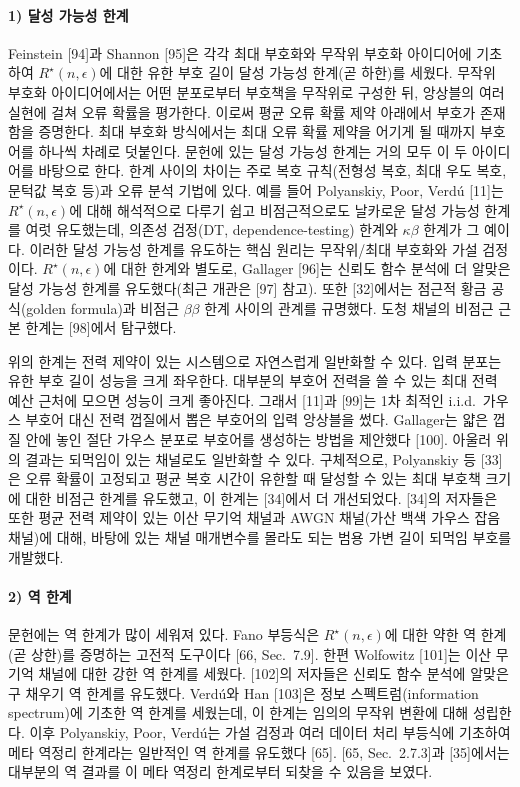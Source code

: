 \paragraph{1) 달성 가능성 한계}
Feinstein [94]과 Shannon [95]은 각각 최대 부호화와 무작위 부호화 아이디어에 기초하여 $R^\star(n,\epsilon)$에 대한 유한 부호 길이 달성 가능성 한계(곧 하한)를 세웠다. 무작위 부호화 아이디어에서는 어떤 분포로부터 부호책을 무작위로 구성한 뒤, 앙상블의 여러 실현에 걸쳐 오류 확률을 평가한다. 이로써 평균 오류 확률 제약 아래에서 부호가 존재함을 증명한다. 최대 부호화 방식에서는 최대 오류 확률 제약을 어기게 될 때까지 부호어를 하나씩 차례로 덧붙인다. 문헌에 있는 달성 가능성 한계는 거의 모두 이 두 아이디어를 바탕으로 한다. 한계 사이의 차이는 주로 복호 규칙(전형성 복호, 최대 우도 복호, 문턱값 복호 등)과 오류 분석 기법에 있다. 예를 들어 Polyanskiy, Poor, Verdú [11]는 $R^\star(n,\epsilon)$에 대해 해석적으로 다루기 쉽고 비점근적으로도 날카로운 달성 가능성 한계를 여럿 유도했는데, 의존성 검정(DT, dependence-testing) 한계와 $\kappa\beta$ 한계가 그 예이다. 이러한 달성 가능성 한계를 유도하는 핵심 원리는 무작위/최대 부호화와 가설 검정이다. $R^\star(n,\epsilon)$에 대한 한계와 별도로, Gallager [96]는 신뢰도 함수 분석에 더 알맞은 달성 가능성 한계를 유도했다(최근 개관은 [97] 참고). 또한 [32]에서는 점근적 황금 공식(golden formula)과 비점근 $\beta\beta$ 한계 사이의 관계를 규명했다. 도청 채널의 비점근 근본 한계는 [98]에서 탐구했다.

위의 한계는 전력 제약이 있는 시스템으로 자연스럽게 일반화할 수 있다. 입력 분포는 유한 부호 길이 성능을 크게 좌우한다. 대부분의 부호어 전력을 쓸 수 있는 최대 전력 예산 근처에 모으면 성능이 크게 좋아진다. 그래서 [11]과 [99]는 1차 최적인 i.i.d.\ 가우스 부호어 대신 전력 껍질에서 뽑은 부호어의 입력 앙상블을 썼다. Gallager는 얇은 껍질 안에 놓인 절단 가우스 분포로 부호어를 생성하는 방법을 제안했다 [100]. 아울러 위의 결과는 되먹임이 있는 채널로도 일반화할 수 있다. 구체적으로, Polyanskiy 등 [33]은 오류 확률이 고정되고 평균 복호 시간이 유한할 때 달성할 수 있는 최대 부호책 크기에 대한 비점근 한계를 유도했고, 이 한계는 [34]에서 더 개선되었다. [34]의 저자들은 또한 평균 전력 제약이 있는 이산 무기억 채널과 AWGN 채널(가산 백색 가우스 잡음 채널)에 대해, 바탕에 있는 채널 매개변수를 몰라도 되는 범용 가변 길이 되먹임 부호를 개발했다.

\paragraph{2) 역 한계}
문헌에는 역 한계가 많이 세워져 있다. Fano 부등식은 $R^\star(n,\epsilon)$에 대한 약한 역 한계(곧 상한)를 증명하는 고전적 도구이다 [66, Sec.~7.9]. 한편 Wolfowitz [101]는 이산 무기억 채널에 대한 강한 역 한계를 세웠다. [102]의 저자들은 신뢰도 함수 분석에 알맞은 구 채우기 역 한계를 유도했다. Verdú와 Han [103]은 정보 스펙트럼(information spectrum)에 기초한 역 한계를 세웠는데, 이 한계는 임의의 무작위 변환에 대해 성립한다. 이후 Polyanskiy, Poor, Verdú는 가설 검정과 여러 데이터 처리 부등식에 기초하여 메타 역정리 한계라는 일반적인 역 한계를 유도했다 [65]. [65, Sec.~2.7.3]과 [35]에서는 대부분의 역 결과를 이 메타 역정리 한계로부터 되찾을 수 있음을 보였다.

